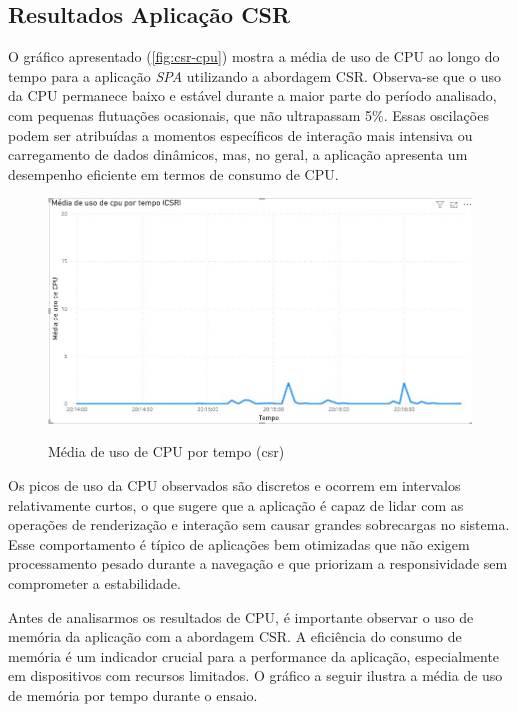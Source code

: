 {\subsection{Resultados Aplicação CSR}
\label{subsec:resultados-csr}

O gráfico apresentado (\autoref{fig:csr-cpu}) mostra a média de uso de CPU ao longo do tempo para a aplicação \emph{SPA} utilizando a abordagem CSR. Observa-se que o uso da CPU permanece baixo e estável durante a maior parte do período analisado, com pequenas flutuações ocasionais, que não ultrapassam 5\%. Essas oscilações podem ser atribuídas a momentos específicos de interação mais intensiva ou carregamento de dados dinâmicos, mas, no geral, a aplicação apresenta um desempenho eficiente em termos de consumo de CPU.

\begin{figure}[h]
\centering
\caption{Média de uso de CPU por tempo (\acrshort{csr})}
\includegraphics[width=1.0\textwidth]{media/uso_cpu_csr.jpeg}
\label{fig:csr-cpu}
\end{figure}


Os picos de uso da CPU observados são discretos e ocorrem em intervalos relativamente curtos, o que sugere que a aplicação é capaz de lidar com as operações de renderização e interação sem causar grandes sobrecargas no sistema. Esse comportamento é típico de aplicações bem otimizadas que não exigem processamento pesado durante a navegação e que priorizam a responsividade sem comprometer a estabilidade.

Antes de analisarmos os resultados de CPU, é importante observar o uso de memória da aplicação com a abordagem CSR. A eficiência do consumo de memória é um indicador crucial para a performance da aplicação, especialmente em dispositivos com recursos limitados. O gráfico a seguir ilustra a média de uso de memória por tempo durante o ensaio.


}
